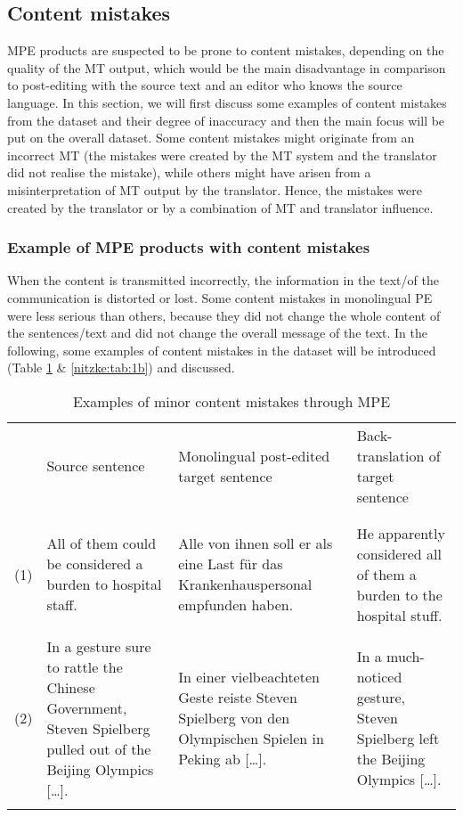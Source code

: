 \documentclass[output=paper]{langsci/langscibook}
\begin{document}
\subsection{Content mistakes\label{nitzke:sec:ContentMistakes}}

MPE products are suspected to be prone to content mistakes, depending on the quality of the MT output, which would be the main disadvantage in comparison to post-editing with the source text and an editor who knows the source language. In this section, we will first discuss some examples of content mistakes from the dataset and their degree of inaccuracy and then the main focus will be put on the overall dataset. Some content mistakes might originate from an incorrect MT (the mistakes were created by the MT system and the translator did not realise the mistake), while others might have arisen from a misinterpretation of MT output by the translator. Hence, the mistakes were created by the translator or by a combination of MT and translator influence.

\subsubsection{ Example of MPE products with content mistakes\label{nitzke:sec:ExampleOfMPEProducts}}

When the content is transmitted incorrectly, the information in the text/of the communication is distorted or lost. Some content mistakes in monolingual PE were less serious than others, because they did not change the whole content of the sentences/text and did not change the overall message of the text. In the following, some examples of content mistakes in the dataset will be introduced (Table \ref{nitzke:tab:1a} \& \ref{nitzke:tab:1b}) and discussed.

\begin{table}
\begin{tabularx}{\textwidth}{lXp{3.6cm}p{3cm}} 
    & Source \newline sentence & Monolingual post-\newline edited target sentence & Back-translation of target sentence \\
\lsptoprule
\multicolumn{3}{l}{Minor content mistakes}\\ 
\\[.1em]
(1) & All of them could be considered a burden to hospital staff. 
  & \raggedright Alle von ihnen soll er als eine Last für das Krankenhauspersonal empfunden haben. & He apparently considered all of them a burden to the hospital stuff.\\ 
\\[.1em]
(2) 
  &   In a gesture sure to rattle the Chinese Government, Steven Spielberg pulled out of the Beijing Olympics [\ldots]. & \raggedright  In einer vielbeachteten Geste reiste Steven Spielberg von den Olympischen Spielen in Peking ab [\ldots]. & In a much-noticed gesture, Steven Spielberg left the Beijing Olympics [\ldots].\\
\lspbottomrule
\end{tabularx}
\caption{Examples of minor content mistakes through MPE}
\label{nitzke:tab:1a}
\end{table}
\end{document}
